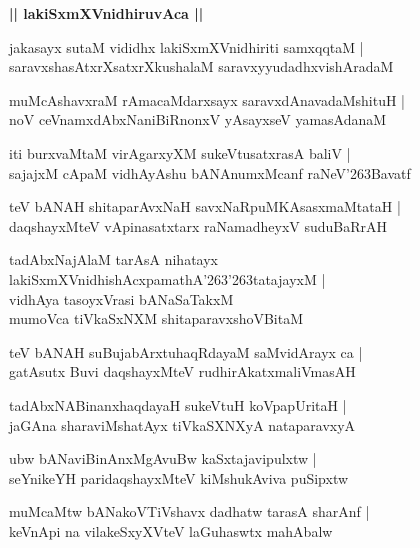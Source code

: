 \documentclass[twoside,12pt,openright]{book}
\def\S{\char'263}
\newcounter{shloka}[chapter]
\def\uvaca#1{\centerline{{\large\textbf{#1}}}}
\begin{document}
\uvaca{|| lakiSxmXVnidhiruvAca ||}

\begin{shloka}%
jakasayx sutaM vididhx lakiSxmXVnidhiriti samxqqtaM |\\
saravxshasAtxrXsatxrXkushalaM saravxyyudadhxvishAradaM 
\end{shloka}

\begin{shloka}%
muMcAshavxraM rAmacaMdarxsayx saravxdAnavadaMshituH |\\
noV ceVnamxdAbxNaniBiRnonxV yAsayxseV yamasAdanaM 
\end{shloka}

\begin{shloka}%
iti burxvaMtaM virAgarxyXM sukeVtusatxrasA baliV |\\
sajajxM cApaM vidhAyAshu bANAnumxMcanf raNeV\S Bavatf
\end{shloka}

\begin{shloka}%
teV bANAH shitaparAvxNaH savxNaRpuMKAsasxmaMtataH |\\
daqshayxMteV vApinasatxtarx raNamadheyxV suduBaRrAH 
\end{shloka}

\begin{shloka}%
tadAbxNajAlaM tarAsA nihatayx \\
lakiSxmXVnidhishAcxpamathA\S \S tatajayxM |\\
vidhAya tasoyxVrasi bANaSaTakxM \\
mumoVca tiVkaSxNXM shitaparavxshoVBitaM 
\end{shloka}

\begin{shloka}%
teV bANAH suBujabArxtuhaqRdayaM saMvidArayx ca |\\
gatAsutx Buvi daqshayxMteV rudhirAkatxmaliVmasAH 
\end{shloka}

\begin{shloka}%
tadAbxNABinanxhaqdayaH sukeVtuH koVpapUritaH |\\
jaGAna sharaviMshatAyx tiVkaSXNXyA nataparavxyA 
\end{shloka}

\begin{shloka}%
ubw bANaviBinAnxMgAvuBw kaSxtajavipulxtw |\\
seYnikeYH paridaqshayxMteV kiMshukAviva puSipxtw
\end{shloka}

\begin{shloka}%
muMcaMtw bANakoVTiVshavx dadhatw tarasA sharAnf |\\
keVnApi na vilakeSxyXVteV laGuhaswtx mahAbalw
\end{shloka}
\end{document}

